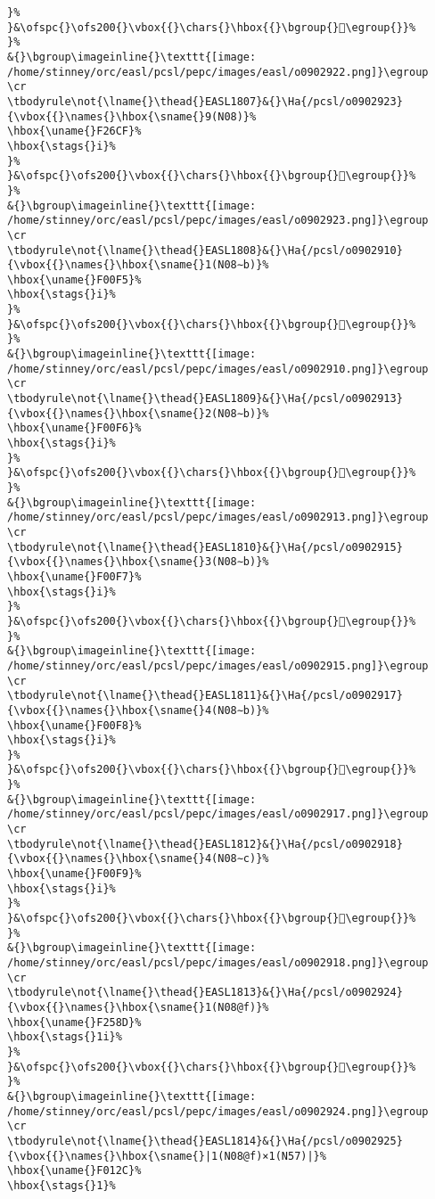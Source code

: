 \begin{verbatim}
}%
}&\ofspc{}\ofs200{}\vbox{{}\chars{}\hbox{{}\bgroup{}󲚼\egroup{}}%
}%
&{}\bgroup\imageinline{}\texttt{[image: /home/stinney/orc/easl/pcsl/pepc/images/easl/o0902922.png]}\egroup
\cr
\tbodyrule\not{\lname{}\thead{}EASL1807}&{}\Ha{/pcsl/o0902923}{\vbox{{}\names{}\hbox{\sname{}9(N08)}%
\hbox{\uname{}F26CF}%
\hbox{\stags{}i}%
}%
}&\ofspc{}\ofs200{}\vbox{{}\chars{}\hbox{{}\bgroup{}󲛏\egroup{}}%
}%
&{}\bgroup\imageinline{}\texttt{[image: /home/stinney/orc/easl/pcsl/pepc/images/easl/o0902923.png]}\egroup
\cr
\tbodyrule\not{\lname{}\thead{}EASL1808}&{}\Ha{/pcsl/o0902910}{\vbox{{}\names{}\hbox{\sname{}1(N08∼b)}%
\hbox{\uname{}F00F5}%
\hbox{\stags{}i}%
}%
}&\ofspc{}\ofs200{}\vbox{{}\chars{}\hbox{{}\bgroup{}󰃵\egroup{}}%
}%
&{}\bgroup\imageinline{}\texttt{[image: /home/stinney/orc/easl/pcsl/pepc/images/easl/o0902910.png]}\egroup
\cr
\tbodyrule\not{\lname{}\thead{}EASL1809}&{}\Ha{/pcsl/o0902913}{\vbox{{}\names{}\hbox{\sname{}2(N08∼b)}%
\hbox{\uname{}F00F6}%
\hbox{\stags{}i}%
}%
}&\ofspc{}\ofs200{}\vbox{{}\chars{}\hbox{{}\bgroup{}󰃶\egroup{}}%
}%
&{}\bgroup\imageinline{}\texttt{[image: /home/stinney/orc/easl/pcsl/pepc/images/easl/o0902913.png]}\egroup
\cr
\tbodyrule\not{\lname{}\thead{}EASL1810}&{}\Ha{/pcsl/o0902915}{\vbox{{}\names{}\hbox{\sname{}3(N08∼b)}%
\hbox{\uname{}F00F7}%
\hbox{\stags{}i}%
}%
}&\ofspc{}\ofs200{}\vbox{{}\chars{}\hbox{{}\bgroup{}󰃷\egroup{}}%
}%
&{}\bgroup\imageinline{}\texttt{[image: /home/stinney/orc/easl/pcsl/pepc/images/easl/o0902915.png]}\egroup
\cr
\tbodyrule\not{\lname{}\thead{}EASL1811}&{}\Ha{/pcsl/o0902917}{\vbox{{}\names{}\hbox{\sname{}4(N08∼b)}%
\hbox{\uname{}F00F8}%
\hbox{\stags{}i}%
}%
}&\ofspc{}\ofs200{}\vbox{{}\chars{}\hbox{{}\bgroup{}󰃸\egroup{}}%
}%
&{}\bgroup\imageinline{}\texttt{[image: /home/stinney/orc/easl/pcsl/pepc/images/easl/o0902917.png]}\egroup
\cr
\tbodyrule\not{\lname{}\thead{}EASL1812}&{}\Ha{/pcsl/o0902918}{\vbox{{}\names{}\hbox{\sname{}4(N08∼c)}%
\hbox{\uname{}F00F9}%
\hbox{\stags{}i}%
}%
}&\ofspc{}\ofs200{}\vbox{{}\chars{}\hbox{{}\bgroup{}󰃹\egroup{}}%
}%
&{}\bgroup\imageinline{}\texttt{[image: /home/stinney/orc/easl/pcsl/pepc/images/easl/o0902918.png]}\egroup
\cr
\tbodyrule\not{\lname{}\thead{}EASL1813}&{}\Ha{/pcsl/o0902924}{\vbox{{}\names{}\hbox{\sname{}1(N08@f)}%
\hbox{\uname{}F258D}%
\hbox{\stags{}1i}%
}%
}&\ofspc{}\ofs200{}\vbox{{}\chars{}\hbox{{}\bgroup{}󲖍\egroup{}}%
}%
&{}\bgroup\imageinline{}\texttt{[image: /home/stinney/orc/easl/pcsl/pepc/images/easl/o0902924.png]}\egroup
\cr
\tbodyrule\not{\lname{}\thead{}EASL1814}&{}\Ha{/pcsl/o0902925}{\vbox{{}\names{}\hbox{\sname{}|1(N08@f)×1(N57)|}%
\hbox{\uname{}F012C}%
\hbox{\stags{}1}%

\end{verbatim}
